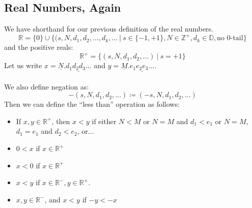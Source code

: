 \documentclass[12pt]{article}
\begin{document}
\subsection{Real Numbers, Again}
We have shorthand for our previous definition of the real numbers.
\[ \mathbb{R} = \{0\} \cup \{(s,N,d_1,d_2,\dots, d_k,\dots \ | \ s \in \{-1,+1\}, N \in \mathbb{Z}^+, d_k \in \mathbb{D}, \text{no 0-tail} \}\]
and the positive reals: \[ \mathbb{R}^+ = \{(s,N,d_1,d_2,\dots) \ | \ s = +1\} \]
Let us write  $x = \underline{N}.\underline{d_1d_2d_3\dots}$ and $y = \underline{M}.\underline{e_1e_2e_3\dots}$. \\ \\
We also define negation as: \[ -(s,N,d_1,d_2,\dots) \coloneqq (-s,N,d_1,d_2,\dots) \]
Then we can define the ``less than'' operation as follows:
\begin{itemize}
\item If $x,y \in \mathbb{R}^+$, then $x<y$ if either $N < M$ or $N =M$ and $d_1 < e_1$ or $N = M$, $d_1 = e_1$ and $d_2 < e_2$, or...
\item $0<x$ if $x \in \mathbb{R}^+$
\item $x < 0$ if $x \in \mathbb{R}^+$
\item  $x<y$ if $x \in \mathbb{R}^-, y \in \mathbb{R}^+$. 
\item $x,y \in \mathbb{R}^-$, and $x<y$ if $-y < -x$
\end{itemize}
\end{document}
